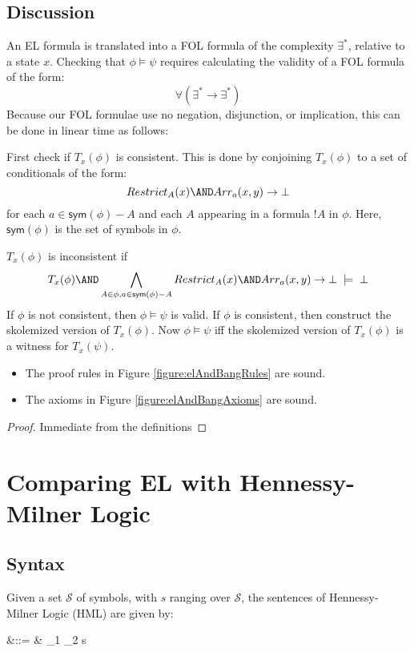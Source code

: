 \subsection{Discussion}
An EL formula is translated into a FOL formula of the complexity $\exists^*$, relative to a state $x$.
Checking that $\phi \models \psi$ requires calculating the validity of a FOL formula of the form:
\[
\forall (\exists^* \rightarrow \exists^*)
\]
Because our FOL formulae use no negation, disjunction, or implication, this can be done in linear time as follows:

First check if $T_x(\phi)$ is consistent.
This is done by conjoining $T_x(\phi)$ to a set of conditionals of the form:
\[
Restrict_A(x) \AND Arr_a(x,y) \rightarrow \bot
\]
for each $a \in \mathsf{sym}(\phi)-A$ and each $A$ appearing in a formula $!A$ in $\phi$.
Here, $\mathsf{sym}(\phi)$ is the set of symbols in $\phi$.

$T_x(\phi)$ is inconsistent if 
\[
T_x(\phi) \AND \bigwedge_{A \in \phi, a \in\mathsf{sym}(\phi)-A} Restrict_A(x) \AND Arr_a(x,y) \rightarrow \bot \; \models \; \bot
\]
If $\phi$ is not consistent, then $\phi \models \psi$ is valid.
If $\phi$ is consistent, then construct the skolemized version of $T_x(\phi)$. 
Now $\phi \models \psi$ iff the skolemized version of  $T_x(\phi)$ is a witness for $T_x(\psi)$. 

\begin{theorem}\label{theorem:elAndBang:soundness}
\begin{itemize}

\item The proof rules in Figure \ref{figure:elAndBangRules} are sound.
\item The axioms in Figure \ref{figure:elAndBangAxioms} are sound.

\end{itemize}
\end{theorem}
\begin{proof}
Immediate from the definitions
\end{proof}

\section{Comparing EL with Hennessy-Milner Logic}
\subsection{Syntax}
Given a set $\mathcal{S}$ of symbols, with $s$ ranging over $\mathcal{S}$, the sentences of Hennessy-Milner Logic (HML) are given by:
\begin{GRAMMAR}
  \phi 
     &\quad ::= \quad & 
  \top \fOr \phi_1 \AND \phi_2 \fOr \langle s \rangle \phi \fOr \neg \phi 
\end{GRAMMAR}
